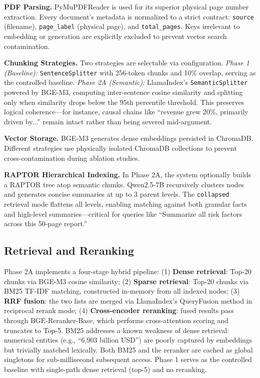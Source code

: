 \documentclass[11pt, a4paper]{article}
\begin{document}
\textbf{PDF Parsing.} PyMuPDFReader is used for its superior physical page number extraction. Every document's metadata is normalized to a strict contract: \texttt{source} (filename), \texttt{page\_label} (physical page), and \texttt{total\_pages}. Keys irrelevant to embedding or generation are explicitly excluded to prevent vector search contamination.

\textbf{Chunking Strategies.} Two strategies are selectable via configuration. \textit{Phase 1 (Baseline):} \texttt{SentenceSplitter} with 256-token chunks and 10\% overlap, serving as the controlled baseline. \textit{Phase 2A (Semantic):} LlamaIndex's \texttt{SemanticSplitter} powered by BGE-M3, computing inter-sentence cosine similarity and splitting only when similarity drops below the 95th percentile threshold. This preserves logical coherence---for instance, causal chains like ``revenue grew 20\%, primarily driven by...'' remain intact rather than being severed mid-argument.

\textbf{Vector Storage.} BGE-M3 generates dense embeddings persisted in ChromaDB. Different strategies use physically isolated ChromaDB collections to prevent cross-contamination during ablation studies.

\textbf{RAPTOR Hierarchical Indexing.} In Phase 2A, the system optionally builds a RAPTOR tree atop semantic chunks. Qwen2.5-7B recursively clusters nodes and generates concise summaries at up to 3 parent levels. The \texttt{collapsed} retrieval mode flattens all levels, enabling matching against both granular facts and high-level summaries---critical for queries like ``Summarize all risk factors across this 50-page report.''

\subsection{Retrieval and Reranking}

Phase 2A implements a four-stage hybrid pipeline: (1) \textbf{Dense retrieval}:
Top-20 chunks via BGE-M3 cosine similarity; (2) \textbf{Sparse retrieval}:
Top-20 chunks via BM25 TF-IDF matching, constructed in-memory from all indexed
nodes; (3) \textbf{RRF fusion}: the two lists are merged via LlamaIndex's
QueryFusion method in reciprocal rerank mode; (4) \textbf{Cross-encoder
    reranking}: fused results pass through BGE-Reranker-Base, which performs
cross-attention scoring and truncates to Top-5. BM25 addresses a known weakness
of dense retrieval: numerical entities (e.g., ``6,903 billion USD'') are poorly
captured by embeddings but trivially matched lexically. Both BM25 and the
reranker are cached as global singletons for sub-millisecond subsequent access.
Phase 1 serves as the controlled baseline with single-path dense retrieval
(top-5) and no reranking.
\end{document}
